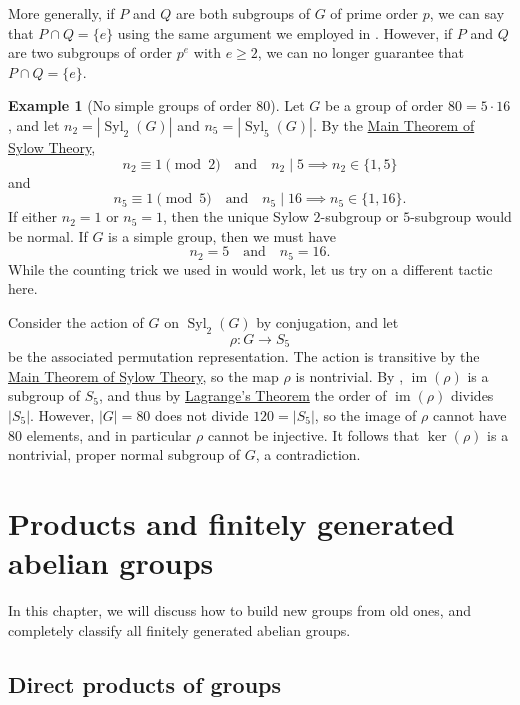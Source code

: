 \documentclass[12pt]{report}
\numberwithin{equation}{section}
\numberwithin{theorem}{chapter}
\theoremstyle{definition}
\newtheorem{example}[theorem]{Example}
\newtheorem*{basic properties}{Basic Properties}
\newtheorem*{Important Remark}{Important Remark}
\renewcommand{\ker}{\operatorname{ker}}
\DeclareMathOperator{\im}{im}
\DeclareMathOperator{\Syl}{Syl}
\begin{document}
More generally, if $P$ and $Q$ are both subgroups of $G$ of prime order $p$, we can say that $P \cap Q = \{ e \}$ using the same argument we employed in . However, if $P$ and $Q$ are two subgroups of order $p^e$ with $e \geqslant 2$, we can no longer guarantee that $P \cap Q = \{ e \}$.


\begin{example}[No simple groups of order $80$]
Let $G$ be a group of order $80=5 \cdot 16$, and let $n_2 = |\Syl_2(G)|$ and $n_5 = |\Syl_5(G)|$. By the \hyperref[Sylow]{Main Theorem of Sylow Theory},
$$n_2 \equiv 1 \!\!\pmod 2 \quad \text{and} \quad n_2 \mid 5 \implies n_2 \in \{1, 5\}$$
and
$$n_5 \equiv 1 \!\!\pmod 5 \quad \text{and} \quad n_5 \mid 16 \implies n_5 \in \{1, 16\}.$$
If either $n_2 = 1$ or $n_5=1$, then the unique Sylow $2$-subgroup or $5$-subgroup would be normal. If $G$ is a simple group, then we must have
$$n_2 = 5 \quad \text{and} \quad n_5 = 16.$$
While the counting trick we used in  would work, let us try on a different tactic here. 

Consider the action of $G$ on $\Syl_2(G)$ by conjugation, and let
$$\rho\!: G \to S_5$$
be the associated permutation representation. The action is transitive by the \hyperref[Sylow]{Main Theorem of Sylow Theory}, so the map $\rho$ is nontrivial. By , $\im(\rho)$ is a subgroup of $S_5$, and thus by \hyperref[Lagrange]{Lagrange's Theorem} the order of $\im(\rho)$ divides $|S_5|$. However, $|G|=80$ does not divide $120 = |S_5|$, so the image of $\rho$ cannot have $80$ elements, and in particular $\rho$ cannot be injective. It follows that $\ker(\rho)$ is a nontrivial, proper normal subgroup of $G$, a contradiction.
\end{example}







\chapter{Products and finitely generated abelian groups}

In this chapter, we will discuss how to build new groups from old ones, and completely classify all finitely generated abelian groups.


\section{Direct products of groups} 
\end{document}
